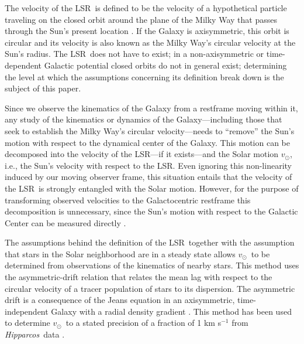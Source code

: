 \documentclass[12pt,preprint]{aastex}
\newcommand{\eg}{e.g.}
\newcommand{\ie}{i.e.}
\newcommand{\Hipparcos}{\textsl{Hipparcos}}
\newcommand{\vsunlsr}{\ensuremath{v_\odot}}
\newcommand{\lsrabb}{LSR}
\begin{document}
The velocity of the \lsrabb\ is defined to be the velocity of a
hypothetical particle traveling on the closed orbit around the plane
of the Milky Way that passes through the Sun's present location
\citep{Binney98a}. If the Galaxy is axisymmetric, this orbit is
circular and its velocity is also known as the Milky Way's circular
velocity at the Sun's radius. The \lsrabb\ does not have to
exist; in a non-axisymmetric or time-dependent Galactic
potential closed orbits do not in general exist; determining the level
at which the assumptions concerning its definition break down is the
subject of this paper.

Since we observe the kinematics of the Galaxy from a restframe moving
within it, any study of the kinematics or dynamics of the
Galaxy---including those that seek to establish the Milky Way's
circular velocity---needs to ``remove'' the Sun's motion with respect
to the dynamical center of the Galaxy. This motion can be decomposed
into the velocity of the \lsrabb---if it exists---and the Solar motion
\vsunlsr, \ie, the Sun's velocity with respect to the \lsrabb. Even
ignoring this non-linearity induced by our moving observer frame, this
situation entails that the velocity of the \lsrabb\ is strongly
entangled with the Solar motion. However, for the purpose of
transforming observed velocities to the Galactocentric restframe this
decomposition is unnecessary, since the Sun's motion with respect to
the Galactic Center can be measured directly \citep[see
below;][]{Reid04a,Ghez08a,Gillessen09a}.

The assumptions behind the definition of the \lsrabb\ together with
the assumption that stars in the Solar neighborhood are in a steady
state allows \vsunlsr\ to be determined from observations of the
kinematics of nearby stars. This method uses the asymmetric-drift
relation that relates the mean lag with respect to the circular
velocity of a tracer population of stars to its dispersion. The
asymmetric drift is a consequence of the Jeans equation in an
axisymmetric, time-independent Galaxy with a radial density gradient
\citep[\eg,][]{binneytremaine}. This method has been used to determine
\vsunlsr\ to a stated precision of a fraction of 1 km s$^{-1}$ from
\Hipparcos\ data \citep{Dehnen98a,Hogg05a,Aumer09a}.
\end{document}
